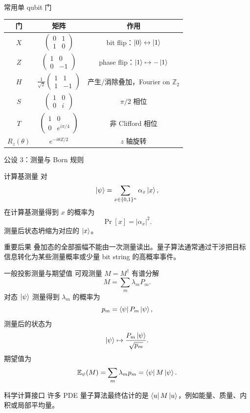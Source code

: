 \documentclass[aspectratio=169,10pt]{ctexbeamer}
\begin{document}
\begin{frame}{常用单 qubit 门}
\begin{center}
\renewcommand{\arraystretch}{1.35}
\begin{tabular}{c c c}
\toprule
门 & 矩阵 & 作用\\
\midrule
$X$ & $\begin{pmatrix}0&1\\1&0\end{pmatrix}$ & bit flip：$\ket0\leftrightarrow\ket1$\\
$Z$ & $\begin{pmatrix}1&0\\0&-1\end{pmatrix}$ & phase flip：$\ket1\mapsto-\ket1$\\
$H$ & $\frac1{\sqrt2}\begin{pmatrix}1&1\\1&-1\end{pmatrix}$ & 产生/消除叠加，Fourier on $\mathbb Z_2$\\
$S$ & $\begin{pmatrix}1&0\\0&i\end{pmatrix}$ & $\pi/2$ 相位\\
$T$ & $\begin{pmatrix}1&0\\0&e^{i\pi/4}\end{pmatrix}$ & 非 Clifford 相位\\
$R_z(\theta)$ & $e^{-i\theta Z/2}$ & $z$ 轴旋转\\
\bottomrule
\end{tabular}
\end{center}
\end{frame}

\begin{frame}{公设 3：测量与 Born 规则}
\begin{keybox}{计算基测量}
对
\[
\ket{\psi}=\sum_{x\in\{0,1\}^n}\alpha_x\ket{x},
\]
在计算基测量得到 $x$ 的概率为
\[
\Pr[x]=|\alpha_x|^2.
\]
测量后状态坍缩为对应的 $\ket{x}$。
\end{keybox}
\begin{warnbox}{重要后果}
叠加态的全部振幅不能由一次测量读出。量子算法通常通过干涉把目标信息转化为某些测量概率或少量 bit string 的高概率事件。
\end{warnbox}
\end{frame}

\begin{frame}{一般投影测量与期望值}
可观测量 $M=M^{\dagger}$ 有谱分解
\[
M=\sum_m \lambda_m P_m.
\]
对态 $\ket\psi$ 测量得到 $\lambda_m$ 的概率为
\[
p_m=\bra\psi P_m\ket\psi,
\]
测量后的状态为
\[
\ket\psi\mapsto \frac{P_m\ket\psi}{\sqrt{p_m}}.
\]
期望值为
\[
\mathbb E_{\psi}(M)=\sum_m\lambda_m p_m=\bra\psi M\ket\psi.
\]
\begin{exbox}{科学计算接口}
许多 PDE 量子算法最终估计的是 $\bra{u}M\ket{u}$，例如能量、质量、内积或局部平均量。
\end{exbox}
\end{frame}
\end{document}
